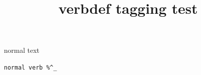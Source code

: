 \documentclass{article}
\title{verbdef tagging test}
\begin{document}
\tableofcontents

\bigskip

normal text

\demo

\demotwo

\stardemo

\verb|normal verb %^_|

\section{\demo}
\end{document}
